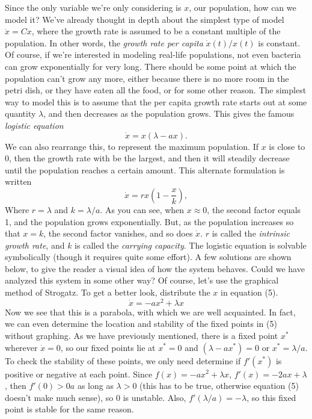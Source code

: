 \documentclass[a5paper]{article}
\theoremstyle{definition}%
\numberwithin{exercise}{section}
\theoremstyle{remark}%
\begin{document}
Since the only variable we're only considering is $x$, our population, how can we model it? We've already thought in depth about the simplest type of model $\dot{x}=Cx$, where the growth rate is assumed to be a constant multiple of the population. In other words, the \emph{growth rate per capita} $\dot{x}(t)/{x}(t)$ is constant. Of course, if we're interested in modeling real-life populations, not even bacteria can grow exponentially for very long. There should be some point at which the population can't grow any more, either because there is no more room in the petri dish, or they have eaten all the food, or for some other reason. The simplest way to model this is to assume that the per capita growth rate starts out at some quantity $\lambda$, and then decreases as the population grows. This gives the famous \emph{logistic equation} 
\begin{equation}
\dot{x}=x(\lambda-ax).
\end{equation}
We can also rearrange this, to represent the maximum population. If $x$ is close to $0$, then the growth rate with be the largest, and then it will steadily decrease until the population reaches a certain amount. This alternate formulation is written 
\begin{equation}
\dot{x}=rx\left(1-\frac{x}{k}\right),
\end{equation}
Where $r=\lambda$ and $k=\lambda/a$. As you can see, when $x\approx0$, the second factor equals 1, and the population grows exponentially. But, as the population increases so that $x=k$, the second factor vanishes, and so does $\dot{x}$. $r$ is called the \emph{intrinsic growth rate}, and $k$ is called the \emph{carrying capacity}. The logistic equation is solvable symbolically (though it requires quite some effort). A few solutions are shown below, to give the reader a visual idea of how the system behaves. 
Could we have analyzed this system in some other way? Of course, let's use the graphical method of Strogatz. To get a better look, distribute the $x$ in equation (5). 
$$\dot{x} =-ax^2+\lambda x$$
Now we see that this is a parabola, with which we are well acquainted. In fact, we can even determine the location and stability of the fixed points in (5) without graphing. As we have previously mentioned, there is a fixed point $x^*$ wherever $\dot{x}=0$, so our fixed points lie at 
$x^*=0$
and 
$(\lambda-ax^*)=0$
or $x^*=\lambda/a$. To check the stability of these points, we only need determine if $f'(x^*)$ is positive or negative at each point. Since $f(x)=-ax^2+\lambda x$, $f'(x)=-2ax+\lambda$, then $f'(0)>0a$ as long as $\lambda>0$ (this has to be true, otherwise equation (5) doesn't make much sense), so $0$ is unstable. Also, $f'(\lambda/a)=-\lambda$, so this fixed point is stable for the same reason. 
\end{document}
